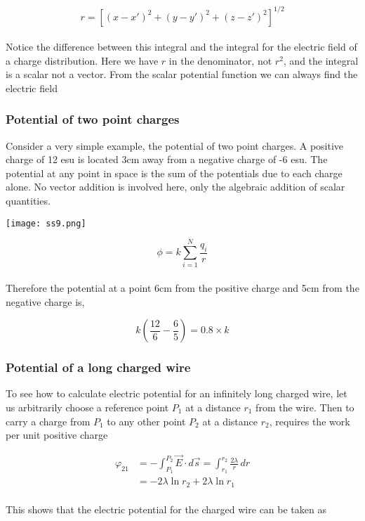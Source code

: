 \documentclass[svgnames]{article}
\begin{document}
 \[ r = [(x-x')^2 + (y-y')^2 + (z-z')^2 ]^{1/2} \] \\
 
 Notice the difference between this integral and the integral for the electric field of a charge distribution. Here we have $r$ in the denominator, not $r^2$, and the integral is a scalar not a vector. From the scalar potential function we can always find the electric field 
 
 \subsubsection{Potential of two point charges} 
 
 Consider a very simple example, the potential of two point charges. A positive charge of 12 esu is located 3cm away from a negative charge of -6 esu. The potential at any point in space is the sum of the potentials due to each charge alone. No vector addition is involved here, only the algebraic addition of scalar quantities. 

\begin{center}
\texttt{[image: ss9.png]}
\end{center} 

\[ \phi = k\sum_{i=1}^N \frac{q_i}{r} \] \\

Therefore the potential at a point 6cm from the positive charge and 5cm from the negative charge is, 

\[
k (\frac{12}{6} - \frac{6}{5}) = 0.8 \times k
\]

\subsubsection{Potential of a long charged wire} 

To see how to calculate electric potential for an infinitely long charged wire, let us arbitrarily choose a reference point $P_1$ at a distance $r_1$ from the wire. Then to carry a charge from $P_1$ to any other point $P_2$ at a distance $r_2$, requires the work per unit positive charge 

\begin{align*} 
\varphi_{21} &= -\int_{P_1}^{P_2} \vec{E} \cdot d\vec{s} = \int_{r_1}^{r_2} \frac{2\lambda}{r} \, dr \\
&= -2 \lambda \ln r_2 + 2\lambda \ln r_1 
\end{align*} \\

This shows that the electric potential for the charged wire can be taken as 
\end{document}
